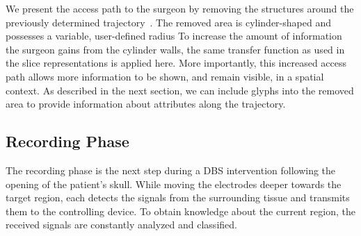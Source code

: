 \documentclass[review]{vgtc}                 %
\begin{document}
We present the access path to the surgeon by removing the structures around the previously determined trajectory~\cite{Weiskopf2002,Rieder2008}. The removed area is cylinder-shaped and possesses a variable, user-defined radius
To increase the amount of information the surgeon gains from the cylinder walls, the same transfer function as used in the slice representations is applied here. More importantly, this increased access path allows more information to be shown, and remain visible, in a spatial context. As described in the next section, we can include glyphs into the removed area to provide information about attributes along the trajectory.
%

\subsection{Recording Phase}\label{sec:overview:recording}
The recording phase is the next step during a DBS intervention following the opening of the patient's skull. While moving the electrodes deeper towards the target region, each detects the signals from the surrounding tissue and transmits them to the controlling device. To obtain knowledge about the current region, the received signals are constantly analyzed and classified.
\end{document}
